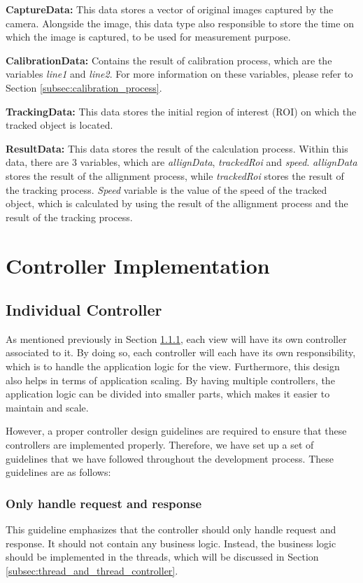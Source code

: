 \textbf{CaptureData:} This data stores a vector of original images captured by the camera. Alongside the image, this data type also responsible to store the time on which the image is captured, to be used for measurement purpose.

\textbf{CalibrationData:} Contains the result of calibration process, which are the variables \textit{line1} and \textit{line2}. For more information on these variables, please refer to Section \ref{subsec:calibration_process}.

\textbf{TrackingData:} This data stores the initial region of interest (ROI) on which the tracked object is located.

\textbf{ResultData:} This data stores the result of the calculation process. Within this data, there are 3 variables, which are \textit{allignData}, \textit{trackedRoi} and \textit{speed}. \textit{allignData} stores the result of the allignment process, while \textit{trackedRoi} stores the result of the tracking process. \textit{Speed} variable is the value of the speed of the tracked object, which is calculated by using the result of the allignment process and the result of the tracking process.

\section{Controller Implementation}
\label{sec:controller_implementation}

\subsection{Individual Controller}
\label{subsec:individual_controller}

As mentioned previously in Section \ref{}, each view will have its own controller associated to it. By doing so, each controller will each have its own responsibility, which is to handle the application logic for the view. Furthermore, this design also helps in terms of application scaling. By having multiple controllers, the application logic can be divided into smaller parts, which makes it easier to maintain and scale.

However, a proper controller design guidelines are required to ensure that these controllers are implemented properly. Therefore, we have set up a set of guidelines that we have followed throughout the development process. These guidelines are as follows:

\subsubsection{Only handle request and response}
This guideline emphasizes that the controller should only handle request and response. It should not contain any business logic. Instead, the business logic should be implemented in the threads, which will be discussed in Section \ref{subsec:thread_and_thread_controller}.

